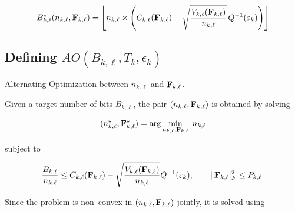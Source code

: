 \documentclass[a4paper, 12pt, onecolumn, journal, twoside, draftclsnofoot]{IEEEtran}
\begin{document}
\begin{equation*}
B^\star_{k,\ell}(n_{k,\ell}, {\bf F}_{k, \ell})
=
\left\lfloor
n_{k,\ell} \times
\left(
C_{k,\ell}({\bf F}_{k, \ell})
-
\sqrt{\frac{V_{k,\ell}({\bf F}_{k, \ell})}{n_{k,\ell}}}
\,Q^{-1}(\varepsilon_k)
\right)
\right\rfloor
\end{equation*}

\subsection {Defining  $AO(B_{k, \ell}, T_k, \epsilon_k)$ }

Alternating Optimization between $n_{k,\ell}$ and ${\bf F}_{k, \ell}$.

Given a target number of bits $B_{k,\ell}$, the pair $(n_{k,\ell},{\bf F}_{k, \ell} )$ is obtained by solving

\begin{equation}
(n_{k,\ell}^\star,{\bf F}_{k, \ell}^\star ) =
\arg\min_{n_{k,\ell},{\bf F}_{k, \ell} } \; n_{k,\ell}
\end{equation}

subject to

\begin{equation}
\frac{B_{k,\ell}}{n_{k.\ell}}
\le
C_{k,\ell}({\bf F}_{k, \ell} )
-
\sqrt{\frac{V_{k,\ell}({\bf F}_{k, \ell} )}{n_{k,\ell}}}
Q^{-1}(\varepsilon_k),
\qquad
\|{\bf F}_{k, \ell} |_F^2 \le P_{k,\ell}.
\end{equation}

Since the problem is non–convex in $(n_{k, \ell},{\bf F}_{k, \ell})$ jointly, it is solved using 
\end{document}
